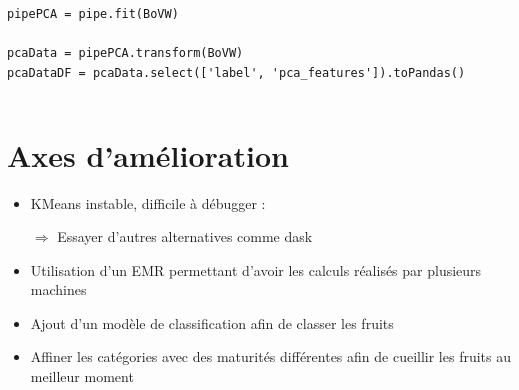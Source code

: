 \documentclass[8pt,aspectratio=169,hyperref={unicode=true}]{beamer}
\begin{document}
\begin{frame}[fragile]{\insertsubsection}
\begin{columns}
\begin{column}{.75\textwidth}
\begin{verbatim}
pipePCA = pipe.fit(BoVW)

pcaData = pipePCA.transform(BoVW)
pcaDataDF = pcaData.select(['label', 'pca_features']).toPandas()
      \end{verbatim}
    \end{column}
  \end{columns}
\end{frame}

\section{Axes d'amélioration}
\begin{frame}{\insertsection}
  \begin{itemize}
    \item KMeans instable, difficile à débugger :
    \item[$\Rightarrow$] Essayer d'autres alternatives comme dask
    \item[]
    \item Utilisation d'un EMR permettant d'avoir les calculs réalisés par plusieurs machines
    \item[]
    \item Ajout d'un modèle de classification afin de classer les fruits
    \item[]
    \item Affiner les catégories avec des maturités différentes afin de cueillir les fruits au meilleur moment 
  \end{itemize}
\end{frame}
\end{document}
